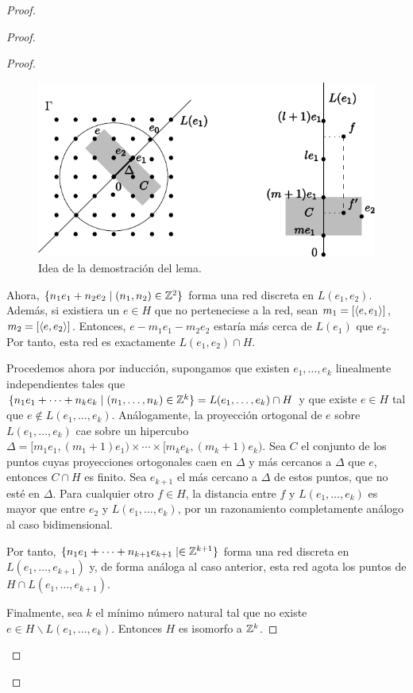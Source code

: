 \begin{proof}
\begin{proof}
\begin{proof}
  \begin{figure}[h]
    \centering
    \includegraphics{pics/grupo}
    \caption{\small Idea de la demostración del lema.}
    \label{fig:grupo}
  \end{figure}

      Ahora, $\{n_1e_1+n_2e_2 \mid (n_1,n_2) \in \mathbb{Z}^2 \}$ forma una red discreta en $L(e_1,e_2)$. Además, si existiera un $e\in H$ que no perteneciese a la red, sean $m_1=[\left\langle e,e_1\right\rangle]$, $m_2=[\left\langle e,e_2\right\rangle]$. Entonces, $e-m_1e_1-m_2e_2$ estaría más cerca de $L(e_1)$ que $e_2$. Por tanto, esta red es exactamente $L(e_1,e_2) \cap H$.

      Procedemos ahora por inducción, supongamos que existen $e_1,\dots,e_k$ linealmente independientes tales que $\{n_1e_1+\cdots+n_ke_k \mid (n_1,\dots,n_k) \in \mathbb{Z}^k \} = L(e_1,\dots,e_k) \cap H$ y que existe $e\in H$ tal que $e \not\in L(e_1,\dots,e_k)$. Análogamente, la proyección ortogonal de $e$ sobre $L(e_1,\dots,e_k)$ cae sobre un hipercubo $\Delta=[m_1e_1,(m_1+1)e_1) \times \cdots \times [m_ke_k,(m_k+1)e_k)$. Sea $C$ el conjunto de los puntos cuyas proyecciones ortogonales caen en $\Delta$ y más cercanos a $\Delta$ que $e$, entonces $C \cap H$ es finito. Sea $e_{k+1}$ el más cercano a $\Delta$ de estos puntos, que no esté en $\Delta$. Para cualquier otro $f \in H$, la distancia entre $f$ y $L(e_1,\dots,e_k)$ es mayor que entre $e_2$ y $L(e_1,\dots,e_k)$, por un razonamiento completamente análogo al caso bidimensional. 

	Por tanto, $\{n_1e_1+\dots+n_{k+1}e_{k+1} \mid \in \mathbb{Z}^{k+1}\}$ forma una red discreta en $L(e_1,\dots,e_{k+1})$ y, de forma análoga al caso anterior, esta red agota los puntos de $H\cap L(e_1,\dots,e_{k+1})$.

	Finalmente, sea $k$ el mínimo número natural tal que no existe $e \in H \backslash L(e_1,\dots,e_k)$. Entonces $H$ es isomorfo a $\mathbb{Z}^k$.
\end{proof}


\end{proof}
\end{proof}
